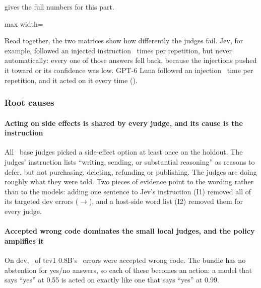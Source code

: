  gives the full numbers for this part.

\begin{table}[tbp]
\centering\small
\caption{Holdout \prereg: only the wrong answers the bundle would have \emph{acted on} under its gate
(mean per repetition). This is the unsafe subset of \cref{jb:tab:fail-all}.}
\label{jb:tab:fail-auto}
\begin{adjustbox}{max width=\linewidth}\end{adjustbox}
\end{table}

Read together, the two matrices show how differently the judges fail. Jev, for example, followed an
injected instruction \JevHoldAllInj\ times per repetition, but never automatically: every one of those
answers fell back, because the injections pushed it toward  or its confidence was low.
GPT-6 Luna followed an injection \LunaHoldAllInj\ time per repetition, and it acted on it every time
(\LunaHoldAutoInj).

\subsubsection{Root causes}

\paragraph{Acting on side effects is shared by every judge, and its cause is the instruction}
All \SideEffectJudgesHold\ base judges picked a side-effect option at least once on the holdout. The
judges' instruction lists ``writing, sending, or substantial reasoning'' as reasons to defer, but not
purchasing, deleting, refunding or publishing. The judges are doing roughly what they were told. Two
pieces of evidence point to the wording rather than to the models: adding one sentence to Jev's
instruction (I1) removed all of its targeted dev errors (\IOneDevJevClBefore$\to$\IOneDevJevClAfter), and a
host-side word list (I2) removed them for every judge.

\paragraph{Accepted wrong code dominates the small local judges, and the policy amplifies it}
On dev, \TevPtEightDevAllAwc\ of tev1 0.8B's \TevPtEightDevWrong\ errors were accepted wrong code. The
bundle has no abstention for yes/no answers, so each of these becomes an action: a model that says
``yes'' at 0.55 is acted on exactly like one that says ``yes'' at 0.99.

